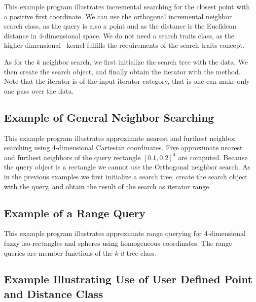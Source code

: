 This example program illustrates incremental searching for the closest
point with a positive first coordinate. We can use the orthogonal
incremental neighbor search class, as the query is also a point and as
the distance is the Euclidean distance in 4-dimensional space. We
do not need a search traits class, as the higher dimensional \Cgal\
kernel fulfills the requirements of the search traits concept.

As for the $k$ neighbor search, we first initialize the search tree with
the data. We then create the search object, and finally obtain the iterator
with the \ccc{begin()} method. Note that the iterator is of the input
iterator category, that is one can make only one pass over the data. 

 


\newpage
\subsection{Example of General Neighbor Searching}

This example program illustrates approximate nearest and furthest
neighbor searching using 4-dimensional Cartesian coordinates.  Five
approximate nearest and furthest neighbors of the query rectangle
$[0.1,0.2]^4$ are computed. Because the query object is a rectangle
we cannot use the Orthogonal neighbor search. As in the previous 
examples we first initialize a search tree, create the search object
with the query, and obtain the result of the search as iterator range.
 

\newpage
\subsection{Example of a Range Query}

This example program illustrates approximate range querying for
4-dimensional fuzzy iso-rectangles and spheres using homogeneous
coordinates. The range queries are member functions of the $k$-$d$ 
tree class.




\newpage
\subsection{Example Illustrating Use of User Defined Point and Distance Class}

